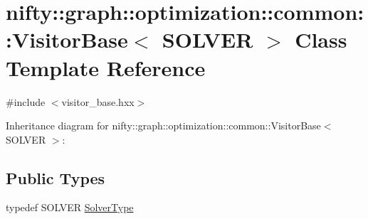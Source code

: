 \hypertarget{classnifty_1_1graph_1_1optimization_1_1common_1_1VisitorBase}{}\section{nifty\+:\+:graph\+:\+:optimization\+:\+:common\+:\+:Visitor\+Base$<$ S\+O\+L\+V\+E\+R $>$ Class Template Reference}
\label{classnifty_1_1graph_1_1optimization_1_1common_1_1VisitorBase}


{\ttfamily \#include $<$visitor\+\_\+base.\+hxx$>$}



Inheritance diagram for nifty\+:\+:graph\+:\+:optimization\+:\+:common\+:\+:Visitor\+Base$<$ S\+O\+L\+V\+E\+R $>$\+:
\subsection*{Public Types}
\begin{DoxyCompactItemize}
\item 
typedef S\+O\+L\+V\+E\+R \hyperlink{classnifty_1_1graph_1_1optimization_1_1common_1_1VisitorBase_a233e657d5334c972e39a44ac675f6e85}{Solver\+Type}
\end{DoxyCompactItemize}
